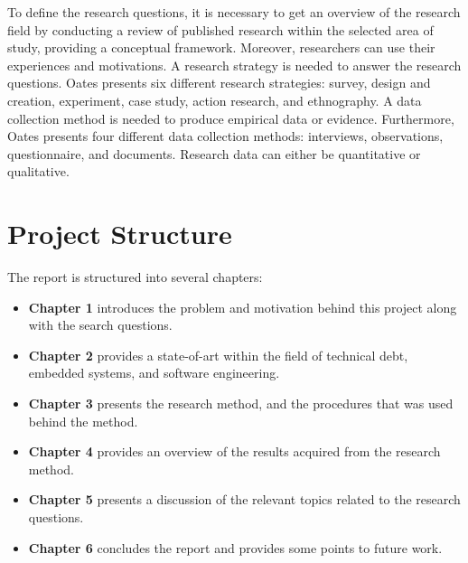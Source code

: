 To define the research questions, it is necessary to get an overview of the research field by conducting a review of published research within the selected area of study, providing a conceptual framework. Moreover, researchers can use their experiences and motivations. A research strategy is needed to answer the research questions. Oates\cite{Oates:2006:RIS:1202299} presents six different research strategies: survey, design and creation, experiment, case study, action research, and ethnography. A data collection method is needed to produce empirical data or evidence. Furthermore, Oates\cite{Oates:2006:RIS:1202299} presents four different data collection methods: interviews, observations, questionnaire, and documents. Research data can either be quantitative or qualitative. 



\section{Project Structure}
The report is structured into several chapters:
\begin{itemize}
	\item \textbf{Chapter 1} introduces the problem and motivation behind this project along with the search questions.
	\item \textbf{Chapter 2} provides a state-of-art within the field of technical debt, embedded systems, and software engineering.
	\item \textbf{Chapter 3} presents the research method, and the procedures that was used behind the method.
	\item \textbf{Chapter 4} provides an overview of the results acquired from the research method.
	\item \textbf{Chapter 5} presents a discussion of the relevant topics related to the research questions.
	\item \textbf{Chapter 6} concludes the report and provides some points to future work. 
\end{itemize}


